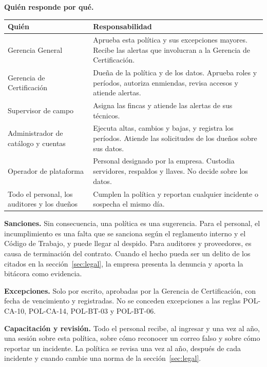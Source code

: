 \documentclass[11pt,letterpaper]{article}
\newcommand{\cab}[1]{\textbf{\rmfamily #1}}
\begin{document}
\Needspace{6cm}
\textbf{Quién responde por qué.}

\begin{center}
\small
\renewcommand{\arraystretch}{1.14}
\begin{tabularx}{\textwidth}{@{}L{4.6cm} Y@{}}
\toprule
\cab{Quién} & \cab{Responsabilidad} \\
\midrule
Gerencia General & Aprueba esta política y sus excepciones mayores. Recibe las alertas que involucran a la Gerencia de Certificación. \\
Gerencia de Certificación & Dueña de la política y de los datos. Aprueba roles y períodos, autoriza enmiendas, revisa accesos y atiende alertas. \\
Supervisor de campo & Asigna las fincas y atiende las alertas de sus técnicos. \\
Administrador de catálogo y cuentas & Ejecuta altas, cambios y bajas, y registra los períodos. Atiende las solicitudes de los dueños sobre sus datos. \\
Operador de plataforma & Personal designado por la empresa. Custodia servidores, respaldos y llaves. No decide sobre los datos. \\
Todo el personal, los auditores y los dueños & Cumplen la política y reportan cualquier incidente o sospecha el mismo día. \\
\bottomrule
\end{tabularx}
\end{center}

\textbf{Sanciones.} Sin consecuencia, una política es una sugerencia. Para el personal, el incumplimiento
es una falta que se sanciona según el reglamento interno y el Código de Trabajo, y puede llegar al
despido. Para auditores y proveedores, es causa de terminación del contrato. Cuando el hecho pueda ser
un delito de los citados en la sección~\ref{sec:legal}, la empresa presenta la denuncia y aporta la
bitácora como evidencia.

\textbf{Excepciones.} Solo por escrito, aprobadas por la Gerencia de Certificación, con fecha de
vencimiento y registradas. No se conceden excepciones a las reglas POL-CA-10, POL-CA-14, POL-BT-03 y
POL-BT-06.

\textbf{Capacitación y revisión.} Todo el personal recibe, al ingresar y una vez al año, una sesión sobre
esta política, sobre cómo reconocer un correo falso y sobre cómo reportar un incidente. La política se
revisa una vez al año, después de cada incidente y cuando cambie una norma de la sección~\ref{sec:legal}.
\end{document}
